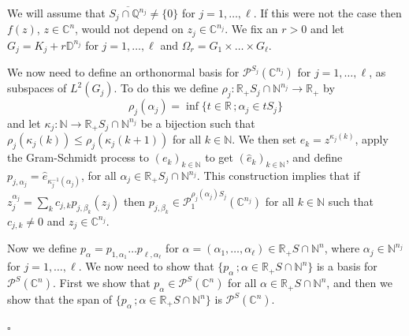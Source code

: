 \documentclass[a4paper,12pt,leqno,english]{article}
\numberwithin{equation}{section}
\newenvironment{proof}{\medbreak\noindent{\bf  Proof:}\rm}{\hfill$\square$\rm}
\begin{document}
\begin{proof}
We will assume that $\overline{S_j \cap \mathbb{Q}^{n_j}} \neq \{0\}$ for $j = 1, \dots, \ell$.
If this were not the case then $f(z)$, $z \in \mathbb{C}^n$, would not depend on $z_j \in \mathbb{C}^{n_j}$.
We fix an $r > 0$ and let $G_j = K_j + r\mathbb{D}^{n_j}$ for $j = 1, \dots, \ell$ and $\Omega_r = G_1 \times \dots \times G_\ell$.

We now need to define an orthonormal basis for $\mathcal{P}^{S_j}(\mathbb{C}^{n_j})$ for $j = 1, \dots, \ell$, as subspaces of $L^2(G_j)$.
To do this we define $\rho_j \colon \mathbb{R}_+S_j \cap \mathbb{N}^{n_j} \rightarrow \mathbb{R}_+$ by
\begin{equation*}
    \rho_j(\alpha_j)
    =
    \inf \{t \in \mathbb{R}\,; \alpha_j \in tS_j\}
\end{equation*}
    and let $\kappa_j \colon \mathbb{N} \rightarrow \mathbb{R}_+S_j \cap \mathbb{N}^{n_j}$ be a bijection such that
$\rho_j(\kappa_j(k)) \leq \rho_j(\kappa_j(k + 1))$ for all $k \in \mathbb{N}$.
We then set $e_k = z^{\kappa_j(k)}$,
    apply the Gram-Schmidt process to $(e_k)_{k \in \mathbb{N}}$ to get $(\hat{e}_k)_{k \in \mathbb{N}}$, and
    define $p_{j, \alpha_j} = \hat{e}_{\kappa_j^{-1}(\alpha_j)}$, for all $\alpha_j \in \mathbb{R}_+S_j \cap \mathbb{N}^{n_j}$.
    This construction implies that if $z_j^{\alpha_j} = \sum_k c_{j, k} p_{j, \beta_k}(z_j)$
    then $p_{j, \beta_k} \in \mathcal{P}^{\rho_j(\alpha_j)S_j}_1(\mathbb{C}^{n_j})$ for all $k \in \mathbb{N}$ such that $c_{j, k} \neq 0$ and
    $z_j \in \mathbb{C}^{n_j}$.

Now we define $p_\alpha = p_{1, \alpha_1} \dots p_{\ell, \alpha_\ell}$
    for $\alpha = (\alpha_1, \dots, \alpha_\ell) \in \mathbb{R}_+S \cap \mathbb{N}^n$,
    where $\alpha_j \in \mathbb{N}^{n_j}$ for $j = 1, \dots, \ell$.
We now need to show that $\{p_\alpha\,; \alpha \in \mathbb{R}_+S \cap \mathbb{N}^n\}$ is a basis for $\mathcal{P}^S(\mathbb{C}^n)$.
First we show that $p_\alpha \in \mathcal{P}^S(\mathbb{C}^n)$ for all $\alpha \in \mathbb{R}_+S \cap \mathbb{N}^n$,
    and then we show that the span of $\{p_\alpha\,; \alpha \in \mathbb{R}_+S \cap \mathbb{N}^n\}$ is $\mathcal{P}^S(\mathbb{C}^n)$.


\end{proof}
\end{document}

